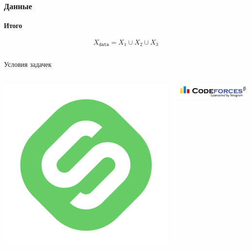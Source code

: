 \documentclass[10pt]{beamer}
\begin{document}
\begin{frame}
\frametitle{Данные}
\framesubtitle{Итого}

$$X_{\texttt{data}} = X_1 \cup X_2 \cup X_3$$

\begin{columns}[T]
    \begin{column}[T]{0.33\textwidth}
        \begin{center}
            Условия задачек \\
            \begin{columns}
                \begin{column}{0.35\textwidth}
                    \begin{center}
                        \includegraphics[width=\textwidth]{images/stepik.png}
                    \end{center}
                \end{column}
                \begin{column}{0.65\textwidth}
                    \begin{center}
                        \includegraphics[width=\textwidth]{images/codeforces.png} \\

\end{center}
\end{column}
\end{columns}
\end{center}
\end{column}
\end{columns}
\end{frame}
\end{document}
